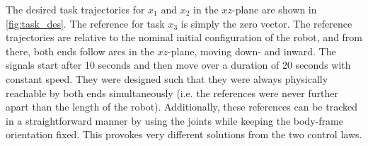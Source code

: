 \documentclass[../main.tex]{subfiles}
\begin{document}
The desired task trajectories for \( x_1 \) and \( x_2 \) in the \(xz\)-plane are shown in \cref{fig:task_des}. The reference for task \( x_3 \) is simply the zero vector. The reference trajectories are relative to the nominal initial configuration of the robot, and from there, both ends follow arcs in the \( xz \)-plane, moving down- and inward. The signals start after 10 seconds and then move over a duration of 20 seconds with constant speed. They were designed such that they were always physically reachable by both ends simultaneously (i.e. the references were never further apart than the length of the robot). Additionally, these references can be tracked in a straightforward manner by using the joints while keeping the body-frame orientation fixed. This provokes very different solutions from the two control laws.
\end{document}

